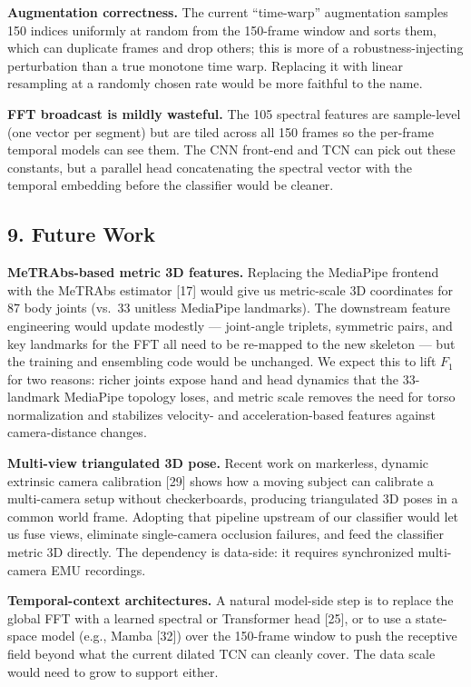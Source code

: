 \documentclass[
  11pt,
]{article}
\begin{document}
\textbf{Augmentation correctness.} The current ``time-warp''
augmentation samples 150 indices uniformly at random from the 150-frame
window and sorts them, which can duplicate frames and drop others; this
is more of a robustness-injecting perturbation than a true monotone time
warp. Replacing it with linear resampling at a randomly chosen rate
would be more faithful to the name.

\textbf{FFT broadcast is mildly wasteful.} The 105 spectral features are
sample-level (one vector per segment) but are tiled across all 150
frames so the per-frame temporal models can see them. The CNN front-end
and TCN can pick out these constants, but a parallel head concatenating
the spectral vector with the temporal embedding before the classifier
would be cleaner.

\subsection{9. Future Work}\label{future-work}

\textbf{MeTRAbs-based metric 3D features.} Replacing the MediaPipe
frontend with the MeTRAbs estimator {[}17{]} would give us metric-scale
3D coordinates for 87 body joints (vs.~33 unitless MediaPipe landmarks).
The downstream feature engineering would update modestly --- joint-angle
triplets, symmetric pairs, and key landmarks for the FFT all need to be
re-mapped to the new skeleton --- but the training and ensembling code
would be unchanged. We expect this to lift \(F_1\) for two reasons:
richer joints expose hand and head dynamics that the 33-landmark
MediaPipe topology loses, and metric scale removes the need for torso
normalization and stabilizes velocity- and acceleration-based features
against camera-distance changes.

\textbf{Multi-view triangulated 3D pose.} Recent work on markerless,
dynamic extrinsic camera calibration {[}29{]} shows how a moving subject
can calibrate a multi-camera setup without checkerboards, producing
triangulated 3D poses in a common world frame. Adopting that pipeline
upstream of our classifier would let us fuse views, eliminate
single-camera occlusion failures, and feed the classifier metric 3D
directly. The dependency is data-side: it requires synchronized
multi-camera EMU recordings.

\textbf{Temporal-context architectures.} A natural model-side step is to
replace the global FFT with a learned spectral or Transformer head
{[}25{]}, or to use a state-space model (e.g., Mamba {[}32{]}) over the
150-frame window to push the receptive field beyond what the current
dilated TCN can cleanly cover. The data scale would need to grow to
support either.
\end{document}
